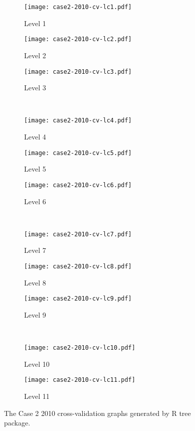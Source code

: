 \begin{appendices}
\begin{figure}[!ht] \centering
	\captionsetup[subfigure]{width=2.0in}
	\begin{subfigure}[t]{0.32\textwidth}
		\texttt{[image: case2-2010-cv-lc1.pdf]}
		\caption{Level 1}
	\end{subfigure}
	\begin{subfigure}[t]{0.32\textwidth}
		\texttt{[image: case2-2010-cv-lc2.pdf]}
		\caption{Level 2}
	\end{subfigure}
	\begin{subfigure}[t]{0.32\textwidth}
		\texttt{[image: case2-2010-cv-lc3.pdf]}
		\caption{Level 3}
	\end{subfigure}\\
	\vspace{5pt}
	\begin{subfigure}[t]{0.32\textwidth}
		\texttt{[image: case2-2010-cv-lc4.pdf]}
		\caption{Level 4}
	\end{subfigure}
	\begin{subfigure}[t]{0.32\textwidth}
		\texttt{[image: case2-2010-cv-lc5.pdf]}
		\caption{Level 5}
	\end{subfigure}
	\begin{subfigure}[t]{0.32\textwidth}
		\texttt{[image: case2-2010-cv-lc6.pdf]}
		\caption{Level 6}
	\end{subfigure}\\
	\vspace{5pt}	
	\begin{subfigure}[t]{0.32\textwidth}
		\texttt{[image: case2-2010-cv-lc7.pdf]}
		\caption{Level 7}
	\end{subfigure}
	\begin{subfigure}[t]{0.32\textwidth}
		\texttt{[image: case2-2010-cv-lc8.pdf]}
		\caption{Level 8}
	\end{subfigure}
	\begin{subfigure}[t]{0.32\textwidth}
		\texttt{[image: case2-2010-cv-lc9.pdf]}
		\caption{Level 9}
	\end{subfigure}\\
	\vspace{5pt}
	\begin{subfigure}[t]{0.32\textwidth}
		\texttt{[image: case2-2010-cv-lc10.pdf]}
		\caption{Level 10}
	\end{subfigure}
	\begin{subfigure}[t]{0.32\textwidth}
		\texttt{[image: case2-2010-cv-lc11.pdf]}
		\caption{Level 11}
	\end{subfigure}
	\vspace{5pt}
	\caption[The Case 2 2010 cross-validation graphs generated by R tree package.]{The Case 2 2010 cross-validation graphs generated by R tree package.}
	\label{fig: appendix-fig.c16.cv}
\end{figure}


\end{appendices}

